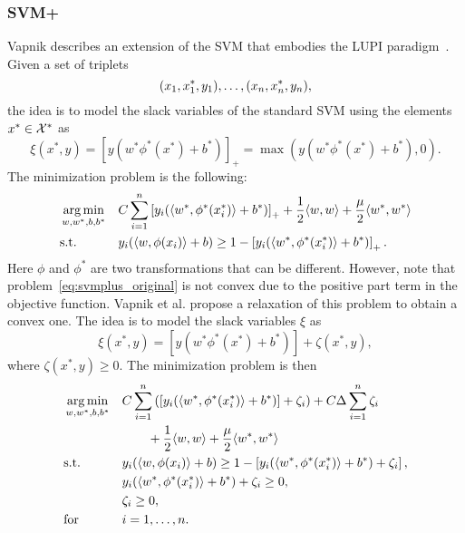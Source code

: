 \subsubsection*{SVM\small{+} }
Vapnik describes an extension of the SVM that embodies the LUPI paradigm~\cite{VapnikV09,VapnikI15a}. Given a set of triplets
\begin{equation}
    \nonumber
    (x_1, x^*_1, y_1), \ldots, (x_n, x^*_n, y_n) ,
\end{equation}
the idea is to model the slack variables of the standard SVM using the elements $x^* \in \mathcal{X}^*$ as
$$ \xi(x^*, y) = \left[y (w^* \phi^*(x^*) + b^*) \right]_+  = \max\left( y (w^* \phi^*(x^*) + b^*), 0  \right).$$
The minimization problem is the following:
\begin{equation}
    \label{eq:svmplus_original}
    \begin{aligned}
        & \argmin_{w, w^*, b, b^*}
        & &  C \sum_{i=1}^\nsamples \left[y_i (\dotp{w^*}{\phi^*(x_i^*)} + b^*) \right]_+ + \frac{1}{2} \dotp{w}{w} + \frac{\mu}{2} \dotp{w^*}{w^*} \\
        & \text{s.t.}
        & & y_{i} ( \dotp{w}{\phi(x_{i})} + b) \geq 1 - \left[y_i (\dotp{w^*}{\phi^*(x^*_i)} + b^*) \right]_+ .
    \end{aligned}
\end{equation}
Here $\phi$ and $\phi^*$ are two transformations that can be different.
However, note that problem~\eqref{eq:svmplus_original} is not convex due to the positive part term in the objective function. Vapnik et al. propose a relaxation of this problem to obtain a convex one. The idea is to model the slack variables $\xi$ as
$$ \xi(x^*, y) = \left[y (w^* \phi^*(x^*) + b^*) \right] + \zeta(x^*, y) ,$$
where $\zeta(x^*, y) \geq 0$.
The minimization problem is then
\begin{equation}
    \label{eq:svmplus_delta_primal}
    \begin{aligned}
        & \argmin_{w, w^*, b, b^*}
        & &  C \sum_{i=1}^\nsamples \left( \left[y_i (\dotp{w^*}{\phi^*(x_i^*)} + b^*) \right] + \zeta_i \right) + C \Delta \sum_{i=1}^\nsamples \zeta_i \\
        & & &\qquad + \frac{1}{2} \dotp{w}{w} + \frac{\mu}{2} \dotp{w^*}{w^*} \\
        & \text{s.t.}
        & & y_{i} ( \dotp{w}{\phi(x_{i})} + b) \geq 1 - \left[y_i (\dotp{w^*}{\phi^*(x^*_i)} + b^*) + \zeta_i \right] ,\\
        & & &y_i (\dotp{w^*}{\phi^*(x^*_i)} + b^*) + \zeta_i \geq 0 ,\\
        & & &\zeta_i \geq 0, \\
        & \text{for } & & i=1, \ldots, \nsamples.
    \end{aligned}
\end{equation}
